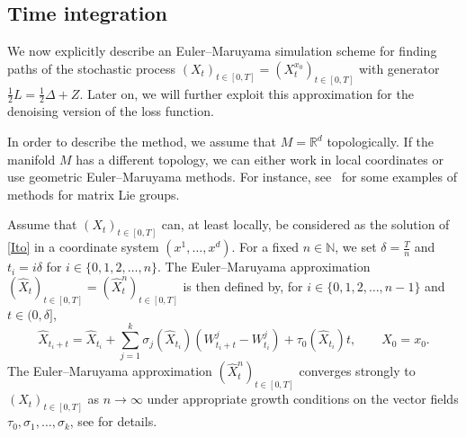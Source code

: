 \documentclass[10pt]{amsart}
\theoremstyle{remark}
\newcommand{\N}{\mathbb{N}}
\newcommand{\soo}{\tau_0}
\numberwithin{equation}{section}
\begin{document}
\subsection{Time integration}
\label{sec:integration}
We now explicitly describe an Euler--Maruyama simulation scheme for finding paths of the stochastic process $(X_t)_{t\in[0,T]}=(X_t^{x_0})_{t\in[0,T]}$ with generator $\frac{1}{2} L = \frac{1}{2} \Delta+Z$. Later on, we will further exploit this approximation for the denoising version of the loss function. 

In order to describe the method, we assume that $M = \mathbb{R}^d$ topologically.
If the manifold $M$ has a different topology, we can either work in local coordinates or use geometric Euler--Maruyama methods. For instance, see~\cite{piggott2016geometric,muniz2022higher} for some examples of methods for matrix Lie groups.

Assume that $(X_t)_{t\in[0,T]}$ can, at least locally, be considered as the solution of \eqref{Ito} in a coordinate system $(x^1,\dots,x^d)$. For a fixed $n\in\N$, we set $\delta = \frac{T}{n}$ and $t_i = i \delta$ for $i\in\{0,1,2,\dots, n\}$. The Euler--Maruyama approximation $(\hat X_t)_{t\in[0,T]} = (\hat X_t^{n})_{t\in[0,T]}$ is then defined by, for $i\in\{0,1,2,\dots, n-1\}$ and $t\in(0,\delta]$,
\begin{equation}
    \hat X_{t_i+t} = \hat X_{t_i} + \sum_{j=1}^k \sigma_j(\hat X_{t_{i}})  (W_{t_i+t}^j-W_{t_i}^j) + \soo(\hat X_{t_{i}}) t, \qquad \hat X_0 = x_0.
    \label{eq:EulerMaruyama}
\end{equation}
The Euler--Maruyama approximation $(\hat X_t^n)_{t\in[0,T]}$ converges strongly to $(X_t)_{t\in[0,T]}$ as $n\to\infty$ under appropriate growth conditions on the vector fields $\soo,\sigma_1,\dots, \sigma_k$, see \cite[Theorem~4.5.3 and Theorem~9.6.2]{kloeden1992approximation} for details.
\end{document}

